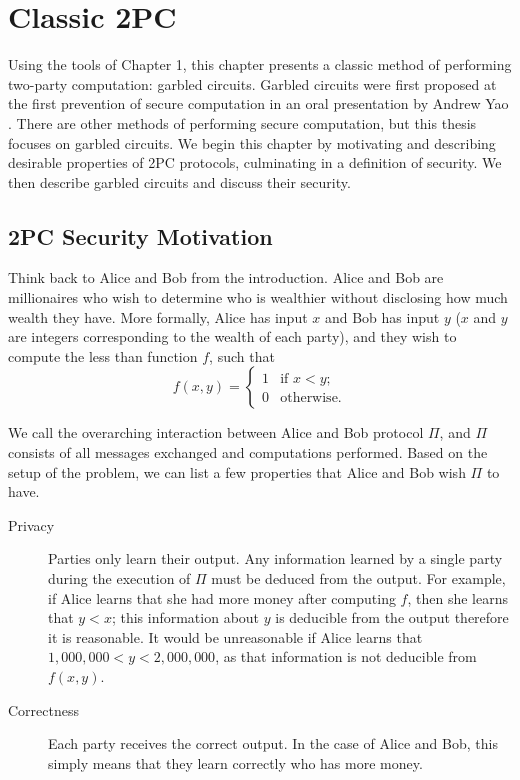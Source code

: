 \chapter{Classic 2PC}

Using the tools of Chapter 1, this chapter presents a classic method of performing two-party computation: garbled circuits.
Garbled circuits were first proposed at the first prevention of secure computation in an oral presentation by Andrew Yao \cite{yao86}.
There are other methods of performing secure computation, but this thesis focuses on garbled circuits. 
We begin this chapter by motivating and describing desirable properties of 2PC protocols, culminating in a definition of security. 
We then describe garbled circuits and discuss their security.

\section{2PC Security Motivation}
Think back to Alice and Bob from the introduction. 
Alice and Bob are millionaires who wish to determine who is wealthier without disclosing how much wealth they have.
More formally, Alice has input $x$ and Bob has input $y$ ($x$ and $y$ are integers corresponding to the wealth of each party), and they wish to compute the less than function $f$, such that 
\begin{equation}
f(x,y) = \left\{
\begin{array}{lr}
    1 & \text{if } x < y \text{;} \\
    0 & \text{otherwise.}
\end{array}
\right.
\end{equation} 

We call the overarching interaction between Alice and Bob protocol $\Pi$, and $\Pi$ consists of all messages exchanged and computations performed.
Based on the setup of the problem, we can list a few properties that Alice and Bob wish $\Pi$ to have.
\begin{description}
    \item[Privacy] 
        Parties only learn their output. 
        Any information learned by a single party during the execution of $\Pi$ must be deduced from the output. 
        For example, if Alice learns that she had more money after computing $f$, then she learns that $y < x$; this information about $y$ is deducible from the output therefore it is reasonable.
        It would be unreasonable if Alice learns that $1,000,000 < y < 2,000,000$, as that information is not deducible from $f(x,y)$.
    \item[Correctness] 
        Each party receives the correct output.
        In the case of Alice and Bob, this simply means that they learn correctly who has more money.

\end{description}

